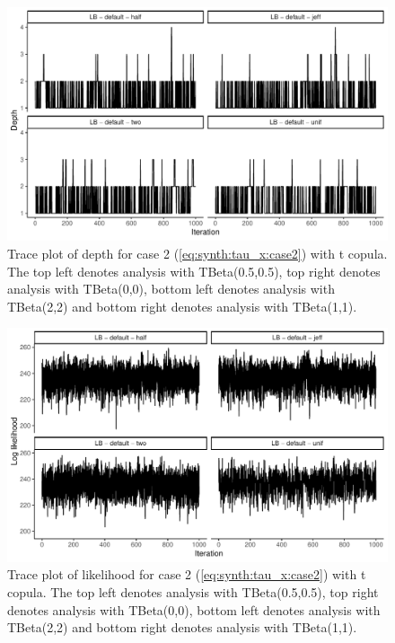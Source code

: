 \documentclass{amsart}
\begin{document}
\begin{figure}
	\centering
	\includegraphics[width = 0.75\linewidth]{trace_case2_t_depth.pdf}
	\caption{Trace plot of depth for case 2 (\cref{eq:synth:tau_x:case2}) with t copula. The top left denotes analysis with TBeta(0.5,0.5), top right denotes analysis with TBeta(0,0), bottom left denotes analysis with TBeta(2,2) and bottom right denotes analysis with TBeta(1,1).}
	\label{fig:case2:t:depth}
\end{figure}

\begin{figure}
	\centering
	\includegraphics[width = 0.75\linewidth]{trace_case2_t_like.pdf}
	\caption{Trace plot of likelihood for case 2 (\cref{eq:synth:tau_x:case2}) with t copula. The top left denotes analysis with TBeta(0.5,0.5), top right denotes analysis with TBeta(0,0), bottom left denotes analysis with TBeta(2,2) and bottom right denotes analysis with TBeta(1,1).}
	\label{fig:case2:t:like}
\end{figure}
\end{document}
